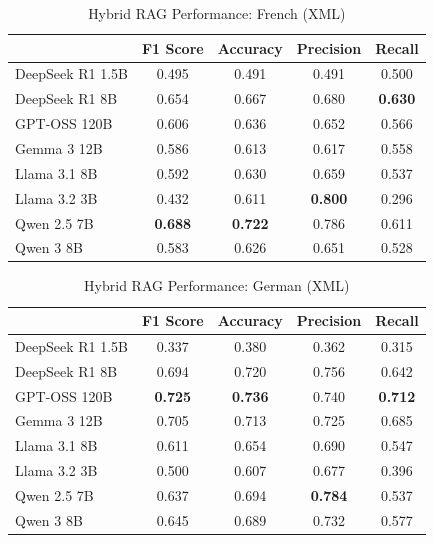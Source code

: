 \begin{table}[!htbp]
\caption{Hybrid RAG Performance: French (XML)}
\label{tab:hybrid_french_xml}
\begin{tabular}{lcccc}
\toprule
 & F1 Score & Accuracy & Precision & Recall \\
\midrule
DeepSeek R1 1.5B & 0.495 & 0.491 & 0.491 & 0.500 \\
DeepSeek R1 8B & 0.654 & 0.667 & 0.680 & \textbf{0.630} \\
GPT-OSS 120B & 0.606 & 0.636 & 0.652 & 0.566 \\
Gemma 3 12B & 0.586 & 0.613 & 0.617 & 0.558 \\
Llama 3.1 8B & 0.592 & 0.630 & 0.659 & 0.537 \\
Llama 3.2 3B & 0.432 & 0.611 & \textbf{0.800} & 0.296 \\
Qwen 2.5 7B & \textbf{0.688} & \textbf{0.722} & 0.786 & 0.611 \\
Qwen 3 8B & 0.583 & 0.626 & 0.651 & 0.528 \\
\bottomrule
\end{tabular}
\end{table}


\begin{table}[!htbp]
\caption{Hybrid RAG Performance: German (XML)}
\label{tab:hybrid_german_xml}
\begin{tabular}{lcccc}
\toprule
 & F1 Score & Accuracy & Precision & Recall \\
\midrule
DeepSeek R1 1.5B & 0.337 & 0.380 & 0.362 & 0.315 \\
DeepSeek R1 8B & 0.694 & 0.720 & 0.756 & 0.642 \\
GPT-OSS 120B & \textbf{0.725} & \textbf{0.736} & 0.740 & \textbf{0.712} \\
Gemma 3 12B & 0.705 & 0.713 & 0.725 & 0.685 \\
Llama 3.1 8B & 0.611 & 0.654 & 0.690 & 0.547 \\
Llama 3.2 3B & 0.500 & 0.607 & 0.677 & 0.396 \\
Qwen 2.5 7B & 0.637 & 0.694 & \textbf{0.784} & 0.537 \\
Qwen 3 8B & 0.645 & 0.689 & 0.732 & 0.577 \\
\bottomrule
\end{tabular}
\end{table}


